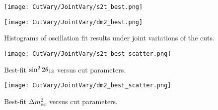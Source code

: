 \documentclass[../thesis.tex]{subfiles}
\begin{document}
\begin{figure}[ht]
  \begin{minipage}{0.5\linewidth}%
    \texttt{[image: CutVary/JointVary/s2t\_best.png]}%
  \end{minipage}%
  \begin{minipage}{0.5\linewidth}%
    \texttt{[image: CutVary/JointVary/dm2\_best.png]}
  \end{minipage}%
  \caption{Histograms of oscillation fit results under joint variations of the cuts.}
  \label{fig:cutVaryJointVaryResults}
\end{figure}

\begin{figure}[h]
  \texttt{[image: CutVary/JointVary/s2t\_best\_scatter.png]}
  \caption{Best-fit $\sin^2 2\theta_{13}$ versus cut parameters.}
  \label{fig:cutVaryJointVaryS2tScatter}
\end{figure}

\begin{figure}[h]
  \texttt{[image: CutVary/JointVary/dm2\_best\_scatter.png]}
  \caption{Best-fit $\Delta m^2_{ee}$ versus cut parameters.}
  \label{fig:cutVaryJointVaryDm2Scatter}
\end{figure}
\end{document}

